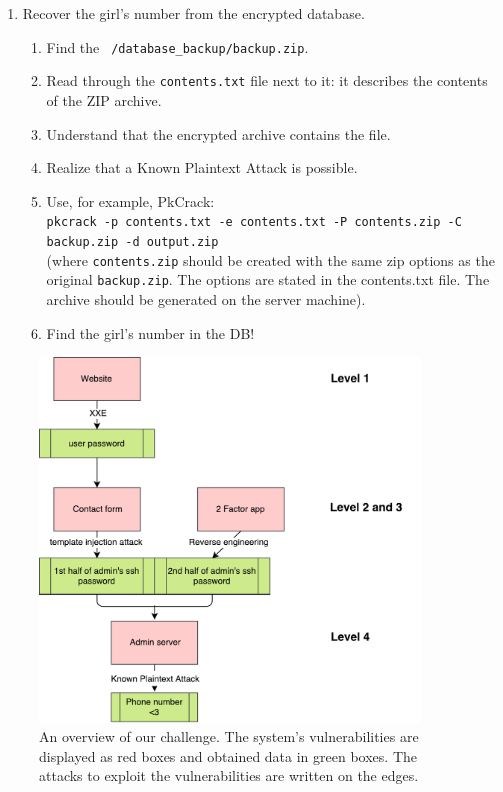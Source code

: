 \documentclass[a4paper]{article}
\begin{document}
\begin{enumerate}
      \item Recover the girl's number from the encrypted database.
        \begin{enumerate}
          \item Find the \texttt{~/database\_backup/backup.zip}.
          \item Read through the \texttt{contents.txt} file next to it:
            it describes the contents of the ZIP archive.
          \item Understand that the encrypted archive contains the file.
          \item Realize that a Known Plaintext Attack is possible.
          \item Use, for example, PkCrack:\\
            \texttt{pkcrack -p contents.txt -e contents.txt -P contents.zip
            -C backup.zip -d output.zip}\\
            (where \texttt{contents.zip} should be created with the same zip
            options as the original \texttt{backup.zip}. The options are stated
            in the contents.txt file. The archive should be generated on the
            server machine).
          \item Find the girl's number in the DB!
        \end{enumerate}

\end{enumerate}

\begin{figure}
    \includegraphics[width=0.9\textwidth]{images/diagram}
    \caption{An overview of our challenge. The system's vulnerabilities
    are displayed as red boxes and obtained data in green boxes. The attacks
    to exploit the vulnerabilities are written on the edges.}
    \label{fig:diag}
\end{figure}
\end{document}

